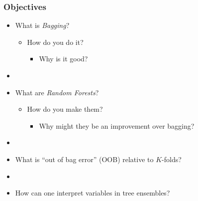 \documentclass[xcolor={dvipsnames}]{beamer}
\begin{document}
\frame
{
 \frametitle{Objectives}
\begin{itemize}
\item<1-> What is \emph{Bagging}?
\begin{itemize}
\item<2-> How do you do it?
\begin{itemize}
\item<3-> Why is it good?
\end{itemize}
\end{itemize}
\item[]
\item<4-> What are \emph{Random Forests}?
\begin{itemize}
\item<5-> How do you make them?
\begin{itemize}
\item<6-> Why might they be an improvement over bagging?
\end{itemize}
\end{itemize}
\item[]
\item<7-> What is ``out of bag error'' (OOB) relative to $K$-folds?
\item[] 
\item<8-> How can one interpret variables in tree ensembles?








 \end{itemize}

}
\end{document}
